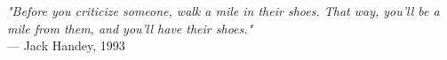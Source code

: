 \begin{flushright}
\emph{"Before you criticize someone, walk a mile in their shoes. That way, you'll be a mile from them, and you'll have their shoes."}\\
— Jack Handey, 1993
\end{flushright}
